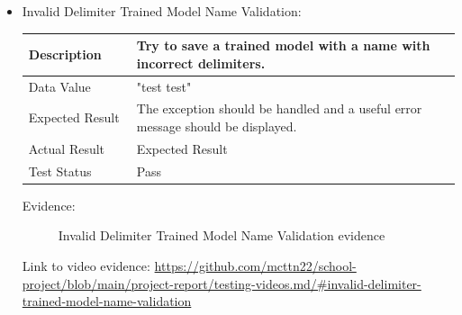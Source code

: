 \documentclass[./project-report/src/latex/project-report.tex]{subfiles}
\begin{document}
\begin{itemize}
	\pagebreak

	\item Invalid Delimiter Trained Model Name Validation: \newline\newline
		\begin{tabular}{|p{0.25\linewidth}|p{0.75\linewidth}|}
			\hline
			Description & Try to save a trained model with a name with incorrect delimiters. \\
			\hline
			Data Value & "test  test" \\
			\hline
			Expected Result & The exception should be handled and a useful error message should be displayed. \\
			\hline
			Actual Result & Expected Result \\
			\hline
			Test Status & Pass \\
			\hline
		\end{tabular}

		\vspace{5mm}

		Evidence:
		\begin{figure}[h!]
		\centering
		\caption{Invalid Delimiter Trained Model Name Validation evidence}
		\end{figure}

		\begin{sloppypar}
		Link to video evidence: \url{https://github.com/mcttn22/school-project/blob/main/project-report/testing-videos.md/#invalid-delimiter-trained-model-name-validation}
		\end{sloppypar}
\end{itemize}
\end{document}
